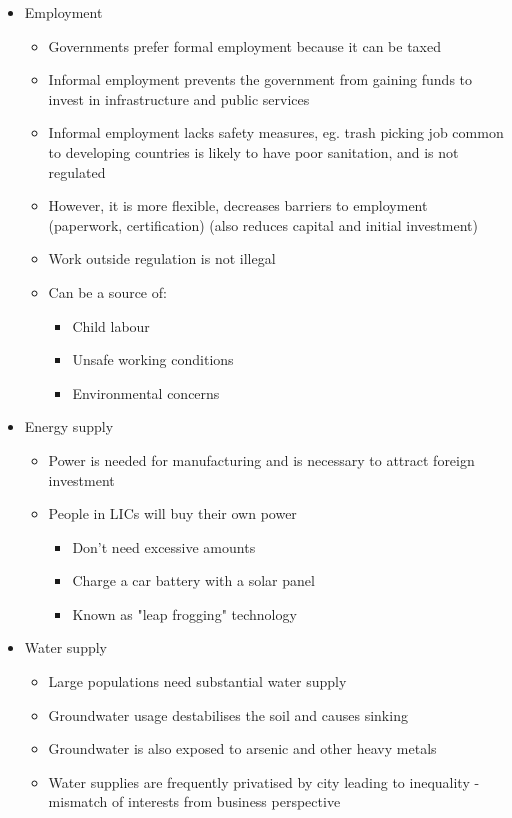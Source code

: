 	\begin{itemize}
		\item Employment
			\begin{itemize}
				\item Governments prefer formal employment because it can be taxed
				\item Informal employment prevents the government from gaining funds to invest in infrastructure and public services
				\item Informal employment lacks safety measures, eg. trash picking job common to developing countries is likely to have poor sanitation, and is not regulated
				\item However, it is more flexible, decreases barriers to employment (paperwork, certification) (also reduces capital and initial investment)
				\item Work outside regulation is not illegal
				\item Can be a source of:
				\begin{itemize}
					\item Child labour
					\item Unsafe working conditions
					\item Environmental concerns
				\end{itemize}
			\end{itemize}

		\item Energy supply
			\begin{itemize}
				\item Power is needed for manufacturing and is necessary to attract foreign investment
				\item People in LICs will buy their own power
				\begin{itemize}
					\item Don't need excessive amounts
					\item Charge a car battery with a solar panel
					\item Known as "leap frogging" technology
				\end{itemize}
			\end{itemize}

		\item Water supply
			\begin{itemize}
				\item Large populations need substantial water supply
				\item Groundwater usage destabilises the soil and causes sinking
				\item Groundwater is also exposed to arsenic and other heavy metals
				\item Water supplies are frequently privatised by city leading to inequality - mismatch of interests from business perspective
			\end{itemize}


\end{itemize}
